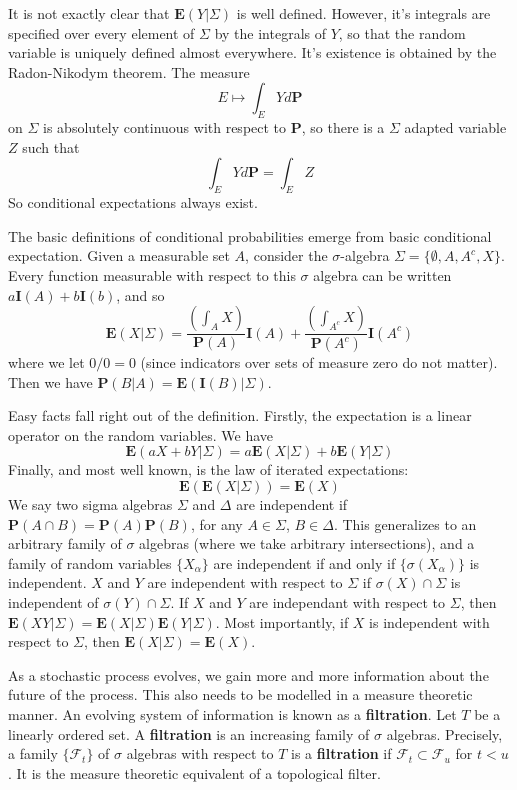 It is not exactly clear that $\mathbf{E}(Y|\Sigma)$ is well defined. However, it's integrals are specified over every element of $\Sigma$ by the integrals of $Y$, so that the random variable is uniquely defined almost everywhere. It's existence is obtained by the Radon-Nikodym theorem. The measure
%
\[ E \mapsto \int_E Y d\mathbf{P} \]
%
on $\Sigma$ is absolutely continuous with respect to $\mathbf{P}$, so there is a $\Sigma$ adapted variable $Z$ such that
%
\[ \int_E Y d\mathbf{P} = \int_E Z \]
%
So conditional expectations always exist.

\begin{example}
    The basic definitions of conditional probabilities emerge from basic conditional expectation. Given a measurable set $A$, consider the $\sigma$-algebra $\Sigma = \{ \emptyset, A, A^c, X \}$. Every function measurable with respect to this $\sigma$ algebra can be written $a \mathbf{I}(A) + b \mathbf{I}(b)$, and so
    \[ \mathbf{E}(X | \Sigma) = \frac{\left( \int_A X \right)}{\mathbf{P}(A)} \mathbf{I}(A) + \frac{\left( \int_{A^c} X \right)}{\mathbf{P}(A^c)} \mathbf{I}(A^c) \]
    where we let $0/0 = 0$ (since indicators over sets of measure zero do not matter). Then we have $\mathbf{P}(B|A) = \mathbf{E}(\mathbf{I}(B)|\Sigma)$.
\end{example}

Easy facts fall right out of the definition. Firstly, the expectation is a linear operator on the random variables. We have
%
\[ \mathbf{E}(aX + bY | \Sigma) = a \mathbf{E}(X | \Sigma) + b \mathbf{E}(Y | \Sigma) \]
%
Finally, and most well known, is the law of iterated expectations:
%
\[ \mathbf{E}(\mathbf{E}(X | \Sigma)) = \mathbf{E}(X) \]
%
We say two sigma algebras $\Sigma$ and $\Delta$ are independent if $\mathbf{P}(A \cap B) = \mathbf{P}(A) \mathbf{P}(B)$, for any $A \in \Sigma$, $B \in \Delta$. This generalizes to an arbitrary family of $\sigma$ algebras (where we take arbitrary intersections), and a family of random variables $\{ X_\alpha \}$ are independent if and only if $\{ \sigma(X_\alpha) \}$ is independent. $X$ and $Y$ are independent with respect to $\Sigma$ if $\sigma(X) \cap \Sigma$ is independent of $\sigma(Y) \cap \Sigma$. If $X$ and $Y$ are independant with respect to $\Sigma$, then $\mathbf{E}(XY | \Sigma) = \mathbf{E}(X|\Sigma) \mathbf{E}(Y|\Sigma)$. Most importantly, if $X$ is independent with respect to $\Sigma$, then $\mathbf{E}(X|\Sigma) = \mathbf{E}(X)$.

As a stochastic process evolves, we gain more and more information about the future of the process. This also needs to be modelled in a measure theoretic manner. An evolving system of information is known as a {\bf filtration}. Let $T$ be a linearly ordered set. A {\bf filtration} is an increasing family of $\sigma$ algebras. Precisely, a family $\{ \mathcal{F}_t \}$ of $\sigma$ algebras with respect to $T$ is a {\bf filtration} if $\mathcal{F}_t \subset \mathcal{F}_u$ for $t < u$. It is the measure theoretic equivalent of a topological filter.

